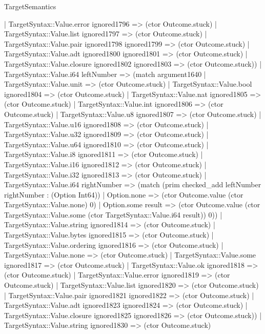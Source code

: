 \begin{lexlean}{TargetSemantics}
\begin{semanticmodule}
{              | TargetSyntax::Value.error ignored1796 => (ctor Outcome.stuck)
              | TargetSyntax::Value.list ignored1797 => (ctor Outcome.stuck)
              | TargetSyntax::Value.pair ignored1798 ignored1799 => (ctor Outcome.stuck)
              | TargetSyntax::Value.adt ignored1800 ignored1801 => (ctor Outcome.stuck)
              | TargetSyntax::Value.closure ignored1802 ignored1803 => (ctor Outcome.stuck))
            | TargetSyntax::Value.i64 leftNumber => (match argument1640
              | TargetSyntax::Value.unit => (ctor Outcome.stuck)
              | TargetSyntax::Value.bool ignored1804 => (ctor Outcome.stuck)
              | TargetSyntax::Value.nat ignored1805 => (ctor Outcome.stuck)
              | TargetSyntax::Value.int ignored1806 => (ctor Outcome.stuck)
              | TargetSyntax::Value.u8 ignored1807 => (ctor Outcome.stuck)
              | TargetSyntax::Value.u16 ignored1808 => (ctor Outcome.stuck)
              | TargetSyntax::Value.u32 ignored1809 => (ctor Outcome.stuck)
              | TargetSyntax::Value.u64 ignored1810 => (ctor Outcome.stuck)
              | TargetSyntax::Value.i8 ignored1811 => (ctor Outcome.stuck)
              | TargetSyntax::Value.i16 ignored1812 => (ctor Outcome.stuck)
              | TargetSyntax::Value.i32 ignored1813 => (ctor Outcome.stuck)
              | TargetSyntax::Value.i64 rightNumber => (match (prim checked_add leftNumber rightNumber : (Option Int64))
                | Option.none => (ctor Outcome.value (ctor TargetSyntax::Value.none) 0)
                | Option.some result => (ctor Outcome.value (ctor TargetSyntax::Value.some (ctor TargetSyntax::Value.i64 result)) 0))
              | TargetSyntax::Value.string ignored1814 => (ctor Outcome.stuck)
              | TargetSyntax::Value.bytes ignored1815 => (ctor Outcome.stuck)
              | TargetSyntax::Value.ordering ignored1816 => (ctor Outcome.stuck)
              | TargetSyntax::Value.none => (ctor Outcome.stuck)
              | TargetSyntax::Value.some ignored1817 => (ctor Outcome.stuck)
              | TargetSyntax::Value.ok ignored1818 => (ctor Outcome.stuck)
              | TargetSyntax::Value.error ignored1819 => (ctor Outcome.stuck)
              | TargetSyntax::Value.list ignored1820 => (ctor Outcome.stuck)
              | TargetSyntax::Value.pair ignored1821 ignored1822 => (ctor Outcome.stuck)
              | TargetSyntax::Value.adt ignored1823 ignored1824 => (ctor Outcome.stuck)
              | TargetSyntax::Value.closure ignored1825 ignored1826 => (ctor Outcome.stuck))
            | TargetSyntax::Value.string ignored1830 => (ctor Outcome.stuck)
}
\end{semanticmodule}
\end{lexlean}
